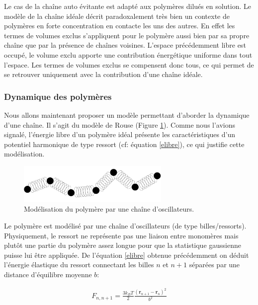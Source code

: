 \documentclass[a4paper,11pt]{article}
\begin{document}
Le cas de la chaîne auto évitante est adapté aux polymères dilués en solution. Le modèle de la chaîne idéale décrit paradoxalement très bien un contexte de polymères en forte concentration en contacte les uns des autres. En effet les termes de volumes exclus s'appliquent pour le polymère aussi bien par sa propre chaîne que par la présence de chaînes voisines. L'espace précédemment libre est occupé, le volume exclu apporte une contribution énergétique uniforme dans tout l'espace. Les termes de volumes exclus se compensent donc tous, ce qui permet de se retrouver uniquement avec la contribution d'une chaîne idéale.

\subsubsection{Dynamique des polymères}

Nous allons maintenant proposer un modèle permettant d'aborder la dynamique d'une chaîne. Il s'agit du modèle de Rouse (Figure \ref{rouse}). Comme nous l'avions signalé, l'énergie libre d'un polymère idéal présente les caractéristiques d'un potentiel harmonique de type ressort (cf: équation \ref{elibre}), ce qui justifie cette modélisation.

\begin{figure}[H]
\begin{center}
\includegraphics[width=0.65\textwidth]{rouse.jpg}

\caption{Modélisation du polymère par une chaîne d'oscillateurs.}
\label{rouse}
\end{center}
\end{figure}

Le polymère est modélisé par une chaîne d'oscillateurs (de type billes/ressorts). Physiquement, le ressort ne représente pas une liaison entre monomères mais plutôt une partie du polymère assez longue pour que la statistique gaussienne puisse lui être appliquée. De l'équation \ref{elibre} obtenue précédemment on déduit l'énergie élastique du ressort connectant les billes $n$ et $n+1$ séparées par une distance d'équilibre moyenne $b$:


\begin{eqnarray}
F_{n,n+1} = \frac{3 k_B T}{2} \frac{(\textbf{r}_{n+1}-\textbf{r}_n)^2}{b^2}
\end{eqnarray}
\end{document}
